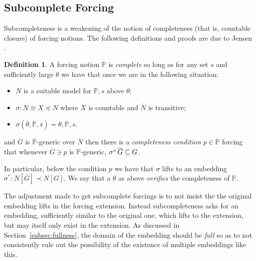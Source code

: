\documentclass{amsart}
\theoremstyle{definition}
\newtheorem{definition}[theorem]{Definition}
\theoremstyle{remark}
\renewcommand{\P}{\mathbb{P}}
\newcommand{\N}{{\overline{N}}}
\newcommand{\G}{\overline{G}}
\begin{document}
\subsection{Subcomplete Forcing} \label{subsec:subcomplete}
Subcompleteness is a weakening of the notion of completeness (that is, countable closure) of forcing notions. The following definitions and proofs are due to Jensen \cite[Ch.~3]{Jensen:2014}.


 
\begin{definition} A forcing notion $\P$ is \emph{complete} so long as
for any set $s$ and sufficiently large $\theta$ we have that once we are in the following situation: \begin{itemize}
	\item $N$ is a suitable model for $\P,s$ above $\theta$;
	\item $\sigma: \N \cong X \preccurlyeq N$ where $X$ is countable and $\N$ is transitive;
	\item $\sigma(\overline \theta, \overline{\P}, \overline s)=\theta, \P, s$.
\end{itemize}
and $\G$ is $\overline{\P}$-generic over $\N$ then there is a \emph{completeness condition} $p \in \P$ forcing that whenever $G \ni p$ is $\P$-generic, $\sigma ``\, \G \subseteq G$. 

In particular, below the condition $p$ we have that $\sigma$ lifts to an embedding $\sigma^*:\N[\G] \prec N[G]$.
We say that a $\theta$ as above \emph{verifies} the completeness of $\P$.
\end{definition}
The adjustment made to get subcomplete forcings is to not insist the the original embedding lifts in the forcing extension. Instead subcompleteness asks for an embedding, sufficiently similar
to the original one, which lifts to the extension, but may itself only exist in the extension.
As discussed in Section~\ref{subsec:fullness}, the domain of the embedding should be \emph{full} so as to not consistently rule out the possibility of the existence of multiple embeddings like this.
\end{document}
